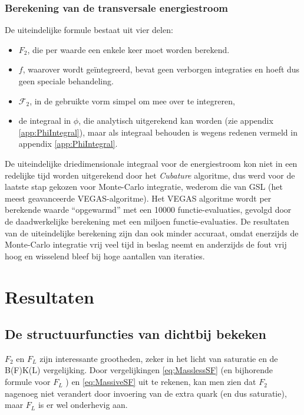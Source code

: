 \documentclass[a4paper,11pt]{article}
\numberwithin{equation}{section} %
\begin{document}
  \subsubsection{Berekening van de transversale energiestroom}
De uiteindelijke formule bestaat uit vier delen:
\begin{itemize}
  \item $F_2$, die per waarde een enkele keer moet worden berekend.
  \item $f$, waarover wordt geïntegreerd, bevat geen verborgen integraties en hoeft dus geen speciale behandeling.
  \item $\mathcal{F}_2$, in de gebruikte vorm simpel om mee over te integreren,
  \item de integraal in $\phi$, die analytisch uitgerekend kan worden (zie appendix \ref{app:PhiIntegral}), maar als integraal behouden is wegens redenen vermeld in appendix \ref{app:PhiIntegral}.
\end{itemize}
De uiteindelijke driedimensionale integraal voor de energiestroom kon niet in een redelijke tijd worden uitgerekend door het \textit{Cubature} algoritme, dus werd voor de laatste stap gekozen voor Monte-Carlo integratie, wederom die van GSL (het meest geavanceerde VEGAS-algoritme).
Het VEGAS algoritme wordt per berekende waarde “opgewarmd” met een 10000 functie-evaluaties, gevolgd door de daadwerkelijke berekening met een miljoen functie-evaluaties.
De resultaten van de uiteindelijke berekening zijn dan ook minder accuraat, omdat enerzijds de Monte-Carlo integratie vrij veel tijd in beslag neemt en anderzijds de fout vrij hoog en wisselend bleef bij hoge aantallen van iteraties.

\section{Resultaten}
    \subsection{De structuurfuncties van dichtbij bekeken} \label{sec:ResSF}
$F_2$ en $F_L$ zijn interessante grootheden, zeker in het licht van saturatie en de B(F)K(L) vergelijking.
Door vergelijkingen \eqref{eq:MasslessSF} (en bijhorende formule voor $F_L$ \cite[sectie 9.5.4]{Barone}) en \eqref{eq:MassiveSF} uit te rekenen, kan men zien dat $F_2$ nagenoeg niet verandert door invoering van de extra quark (en dus saturatie), maar $F_L$ is er wel onderhevig aan.
\end{document}

